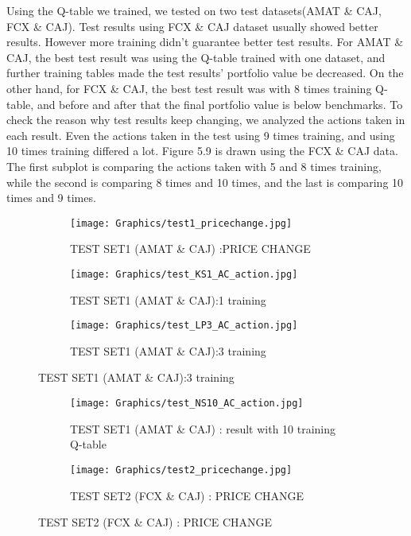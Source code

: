 Using the Q-table we trained, we tested on two test datasets(AMAT \& CAJ, FCX \& CAJ). Test results using FCX \& CAJ dataset usually showed better results. However more training didn’t guarantee better test results. For AMAT \& CAJ, the best test result was using the Q-table trained with one dataset, and further training tables made the test results’ portfolio value be decreased. On the other hand, for FCX \& CAJ, the best test result was with 8 times training Q-table, and before and after that the final portfolio value is below benchmarks. To check the reason why test results keep changing, we analyzed the actions taken in each result. Even the actions taken in the test using 9 times training, and using 10 times training differed a lot. Figure 5.9 is drawn using the FCX \& CAJ data. The first subplot is comparing the actions taken with 5 and 8 times training, while the second is comparing 8 times and 10 times, and the last is comparing 10 times and 9 times.
\vspace{0.05cm}
\begin{figure}[H]
\begin{figure}[H]
\begin{center}
\texttt{[image: Graphics/test1\_pricechange.jpg]} \caption{TEST SET1 (AMAT \& CAJ) :PRICE CHANGE}
\end{center}
\end{figure}
\vspace{0.1cm}
\begin{subfigure}{.5\textwidth}%
\centering
\texttt{[image: Graphics/test\_KS1\_AC\_action.jpg]} \caption{TEST SET1 (AMAT \& CAJ):1 training} 
\end{subfigure}%
\vspace{0.1cm}
\begin{subfigure}{.5\textwidth}%
\centering
\texttt{[image: Graphics/test\_LP3\_AC\_action.jpg]} \caption{TEST SET1 (AMAT \& CAJ):3 training}
\end{subfigure}%
\end{figure}%

\newpage

\begin{figure}[H]
\begin{figure}[H]
\begin{center}
\texttt{[image: Graphics/test\_NS10\_AC\_action.jpg]} \caption{TEST SET1 (AMAT \& CAJ) : result with 10 training Q-table}
\end{center}
\end{figure}
\vspace{0.1cm}
\begin{figure}[H]
\begin{center}
\texttt{[image: Graphics/test2\_pricechange.jpg]} \caption{TEST SET2 (FCX \& CAJ) : PRICE CHANGE}
\end{center}
\end{figure}
\vspace{0.1cm}
\end{figure}

